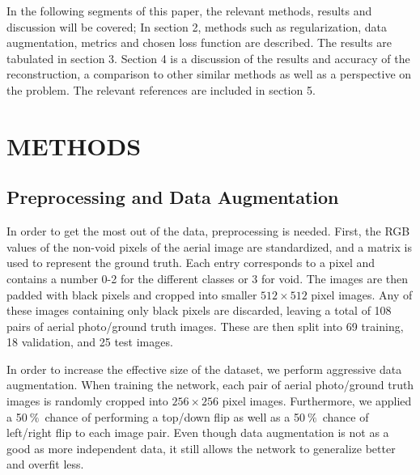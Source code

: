 \documentclass{article}
\newcommand{\pro}{\ensuremath{\ \%}}
\begin{document}
In the following segments of this paper, the relevant methods, results and discussion will be covered; In section 2, methods such as regularization, data augmentation, metrics and chosen loss function are described. The results are tabulated in section 3. Section 4 is a discussion of the results and accuracy of the reconstruction, a comparison to other similar methods as well as a perspective on the problem. The relevant references are included in section 5.

\section{METHODS}
\label{sec:format}

\subsection{Preprocessing and Data Augmentation}
In order to get the most out of the data, preprocessing is needed.
First, the RGB values of the non-void pixels of the aerial image are standardized, and a matrix is used to represent the ground truth.
Each entry corresponds to a pixel and contains a number 0-2 for the different classes or 3 for void.
The images are then padded with black pixels and cropped into smaller $ 512\times 512 $ pixel images.
Any of these images containing only black pixels are discarded, leaving a total of 108 pairs of aerial photo/ground truth images.
These are then split into 69 training, 18 validation, and 25 test images.

In order to increase the effective size of the dataset, we perform aggressive data augmentation.
When training the network, each pair of aerial photo/ground truth images is randomly cropped into $ 256\times 256 $ pixel images.
Furthermore, we applied a 50\pro\ chance of performing a top/down flip as well as a 50\pro\ chance of left/right flip to each image pair.
Even though data augmentation is not as a good as more independent data, it still allows the network to generalize better and overfit less.
\end{document}
